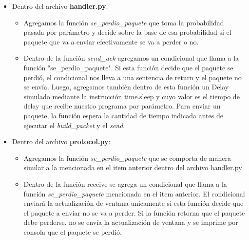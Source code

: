 \begin{itemize}

\item Dentro del archivo \textbf{handler.py}:

\begin{itemize}

\item Agregamos la funci\'on \textit{se\_perdio\_paquete} que toma la probabilidad pasada por parámetro y decide sobre la base de esa probabilidad si el paquete que va a enviar efectivamente se va a perder o no.

\item Dentro de la función \textit{send\_ack} agregamos un condicional que llama a la función "se\_perdio\_paquete". Si esta función decide que el paquete se perdió, el condicional nos lleva a una sentencia de return y el paquete no se envía. Luego, agregamos también dentro de esta función un Delay simulado mediante la instrucción time.sleep y cuyo valor es el tiempo de delay que recibe nuestro programa por parámetro. Para enviar un paquete, la función espera la cantidad de tiempo indicada antes de ejecutar el \textit{build\_packet} y el \textit{send}.

\end{itemize}

\item Dentro del archivo \textbf{protocol.py}:

\begin{itemize}

\item Agregamos la funci\'on \textit{se\_perdio\_paquete} que se comporta de manera similar a la mencionada en el item anterior dentro del archivo handler.py

\item Dentro de la función receive se agrega un condicional que llama a la funci\'on \textit{se\_perdio\_paquete} mencionada en el item anterior. El condicional enviar\'a la actualizaci\'on de ventana unicamente si esta funci\'on decide que el paquete a enviar no se va a perder. Si la funci\'on retorna que el paquete debe perderse, no se env\'ia la actualizaci\'on de ventana y se imprime por consola que el paquete se perdi\'o.

\end{itemize}

\end{itemize}
 
